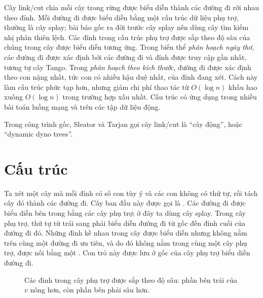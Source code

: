 \documentclass[11pt]{article}
\begin{document}
Cây link/cut chia mỗi cây trong rừng được biểu diễn thành các đường đi rời nhau
theo đỉnh. Mỗi đường đi được biểu diễn bằng một cấu trúc dữ liệu phụ trợ,
thường là cây splay; bài báo gốc ra đời trước cây splay nên dùng cây tìm kiếm
nhị phân thiên lệch. Các đỉnh trong cấu trúc phụ trợ được sắp theo độ sâu của
chúng trong cây được biểu diễn tương ứng. Trong biến thể \textit{phân hoạch
ngây thơ}, các đường đi được xác định bởi các đường đi và đỉnh được truy cập
gần nhất, tương tự cây Tango. Trong \textit{phân hoạch theo kích thước}, đường
đi được xác định theo con nặng nhất, tức con có nhiều hậu duệ nhất, của đỉnh
đang xét. Cách này làm cấu trúc phức tạp hơn, nhưng giảm chi phí thao tác từ
$O(\log n)$ khấu hao xuống $O(\log n)$ trong trường hợp xấu nhất. Cấu trúc có
ứng dụng trong nhiều bài toán luồng mạng và trên các tập dữ liệu động.

Trong công trình gốc, Sleator và Tarjan gọi cây link/cut là ``cây động'', hoặc
``dynamic dyno trees''.

\section{Cấu trúc}

Ta xét một cây mà mỗi đỉnh có số con tùy ý và các con không có thứ tự, rồi tách
cây đó thành các đường đi. Cây ban đầu này được gọi là . Các đường đi được biểu diễn bên trong bằng các cây phụ trợ; ở đây ta
dùng cây splay. Trong cây phụ trợ, thứ tự từ trái sang phải biểu diễn đường đi
từ gốc đến đỉnh cuối của đường đi đó. Những đỉnh kề nhau trong cây được biểu
diễn nhưng không nằm trên cùng một đường đi ưu tiên, và do đó không nằm trong
cùng một cây phụ trợ, được nối bằng một . Con trỏ
này được lưu ở gốc của cây phụ trợ biểu diễn đường đi.

\begin{figure}[ht]
\centering
{}
\caption{Các đỉnh trong cây phụ trợ được sắp theo độ sâu: phần bên trái của \(v\) nông hơn, còn phần bên phải sâu hơn.}
\end{figure}
\end{document}
